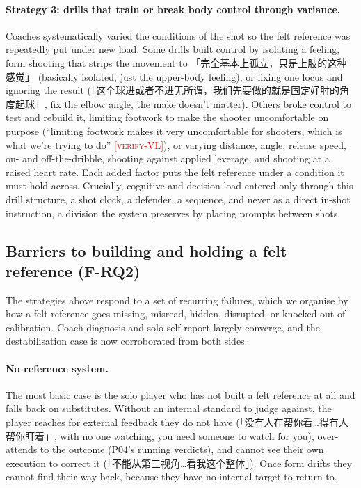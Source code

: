 \documentclass[sigconf]{acmart}
\newcommand{\vf}[1]{\textcolor{red}{[\textsc{#1}]}}
\begin{document}
\paragraph{Strategy 3: drills that train or break body control through variance.} Coaches systematically varied the conditions of the shot so the felt reference was repeatedly put under new load. Some drills built control by isolating a feeling, form shooting that strips the movement to 「完全基本上孤立，只是上肢的这种感觉」 (basically isolated, just the upper-body feeling), or fixing one locus and ignoring the result (「这个球进或者不进无所谓，我们先要做的就是固定好肘的角度起球」, fix the elbow angle, the make doesn't matter). Others broke control to test and rebuild it, limiting footwork to make the shooter uncomfortable on purpose (``limiting footwork makes it very uncomfortable for shooters, which is what we're trying to do'' \vf{verify-VL}), or varying distance, angle, release speed, on- and off-the-dribble, shooting against applied leverage, and shooting at a raised heart rate. Each added factor puts the felt reference under a condition it must hold across. Crucially, cognitive and decision load entered only through this drill structure, a shot clock, a defender, a sequence, and never as a direct in-shot instruction, a division the system preserves by placing prompts between shots.

\subsection{Barriers to building and holding a felt reference (F-RQ2)}

The strategies above respond to a set of recurring failures, which we organise by how a felt reference goes missing, misread, hidden, disrupted, or knocked out of calibration. Coach diagnosis and solo self-report largely converge, and the destabilisation case is now corroborated from both sides.

\paragraph{No reference system.} The most basic case is the solo player who has not built a felt reference at all and falls back on substitutes. Without an internal standard to judge against, the player reaches for external feedback they do not have (「没有人在帮你看…得有人帮你盯着」, with no one watching, you need someone to watch for you), over-attends to the outcome (P04's running verdicts), and cannot see their own execution to correct it (「不能从第三视角…看我这个整体」). Once form drifts they cannot find their way back, because they have no internal target to return to.
\end{document}

